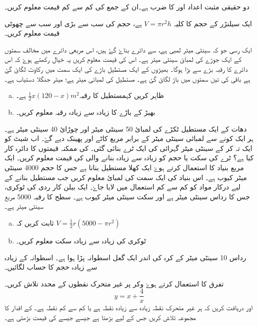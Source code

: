 دو حقیقی مثبت اعداد  اور  کا ضرب    ہے۔ان کے جمع کی کم سے کم قیمت  معلوم کریں۔

ایک سیلنڑر کے حجم کا کلیہ \(V=\pi r^{2}h \)  ہے، حجم   کی سب سے بڑی اور سب سے چھوٹی قیمت معلوم کریں۔

ایک رسی جو کہ  سینٹی میٹر لمبی ہے، سے دائرے  بناۓ گۓ ہیں، اس مربعی دائرے میں مخالف سمتوں کے ایک جوڑے کی لمبائ  سینٹی میٹر ہے۔ اس    کی قیمت معلوم کریں یہ خیال رکھتے ہوۓ کہ اس دائرے کا رقبہ بڑے سے بڑا ہوگا۔
بھیڑوں کے  ایک مستطیل باڑے کی ایک سمت میں رکاوٹ لگائ گئ ہے باقی کی تین سمتوں میں باڑ لگائ گئ ہے۔  مستطیل کی لمبائی  میٹر ہے؛ میٹر جنگلا  دستیاب ہے۔
\begin{enumerate}[a.]
\item
ظاہر کریں کہمستطیل  کا رقبہ\( \frac{1}{2}x(120-x) {m^2} \) ہے۔
\item
بھیڑ کے باڑے کا زیادہ سے زیادہ رقبہ معلوم کریں۔
\end{enumerate}
دھات کے ایک مستطیل ٹکڑے کی لمبائ 50 سینٹی میٹر اور چوڑائ  40 سینٹی میٹر ہے۔ ہر ایک کونے سے لمبائی   سینٹی میٹر کے برابر مربع کاٹے اور پھینک دیے گۓ۔ اب شیٹ کو ایک تہ کر کے  سینٹی میٹر گہرائی کی ایک ٹرے بنائی گئی۔ کی ممکنہ قیمتوں کا دائرہ کار کیا ہے؟ ٹرے کی  سکت یا حجم  کو زیادہ سے زیادہ بنانے والی   کی قیمت معلوم کریں۔
ایک مربع بنیاد کا استعمال کرتے ہوۓ ایک کھلا مستطیل بنانا ہے جس کا حجم 4000 سینٹی میٹر کیوب ہے۔ اس بنیاد کی ایک سمت کی لمبائ معلوم کریں جب مستطیل بنانے کے لیے درکار مواد کو کم سے کم استعمال میں لایا جاۓ۔
ایک بیلن کار ردی کی ٹوکری، جس کا رداس سینٹی میٹر ہے اور سکت  سینٹی میٹر کیوب ہے۔ سطح کا رقبہ 5000  مربع سینٹی میٹر  ہے۔
\begin{enumerate}[a.]
\item
ثابت کریں کہ \( V=\frac{1}{2}r(5000-\pi r^2) \)
\item
ٹوکری کی زیادہ سے زیادہ   سکت معلوم کریں۔
\end{enumerate}

رداس 10 سینٹی میٹر کے کرہ کی اندر ایک گعل اسطوانہ پڑا ہوا ہے۔  اسطوانہ کے زیادہ سے زیادہ حجم کا حساب لگائیں۔


تفرق کا استعمال کرتے ہوۓ وکر پر غیر متحرک نقطوں کے محدد  تلاش کریں۔
\[ y=x+\frac{4}{x} \]
اور  دریافت کریں کہ ہر غیر متحرک نقطہ زیادہ سے زیادہ نقطہ ہے یا کم سے کم نقطہ ہے۔  کے اقدار کا مجموعہ تلاش کریں جس کے لیے   بڑھتا ہے جیسے  جیسے  کی قیمت بڑھتی ہے۔

